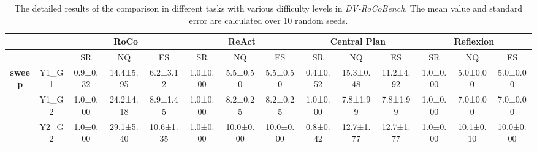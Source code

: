 \documentclass[11pt]{article}
\theoremstyle{plain}
\theoremstyle{remark}
\begin{document}
\begin{table}[t]
\vspace{-2em}
\caption{The detailed results of the comparison in different tasks with various difficulty levels in \emph{DV-RoCoBench}. The mean value and standard error are calculated over 10 random seeds.}
\vspace{-1em}
\begin{center}
\begin{small}
\begin{sc}
\scriptsize

\begin{adjustbox}{width=1\textwidth}
\begin{tabular}{ccccccccccclll}
\hline
\multicolumn{2}{c}{}                                     & \multicolumn{3}{c}{\textbf{RoCo}}                                & \multicolumn{3}{c}{\textbf{ReAct}}                               & \multicolumn{3}{c}{\textbf{Central Plan}}                          & \multicolumn{3}{c}{\textbf{Reflexion}}                                                                  \\ \hline
                          & \multicolumn{1}{c|}{}        & SR        & NQ         & \multicolumn{1}{c|}{ES}        & SR        & NQ         & \multicolumn{1}{c|}{ES}        & SR        & NQ           & \multicolumn{1}{c|}{ES}        & \multicolumn{1}{c}{SR}        & \multicolumn{1}{c}{NQ}         & \multicolumn{1}{c}{ES}        \\ \hline
\multirow{5}{*}{\textbf{sweep}}    & \multicolumn{1}{c|}{Y1\_G1}  & 0.9±0.32  & 14.4±5.95  & \multicolumn{1}{c|}{6.2±3.12}  & 1.0±0.00  & 5.5±0.50   & \multicolumn{1}{c|}{5.5±0.50}  & 0.4±0.52  & 15.3±0.48    & \multicolumn{1}{c|}{11.2±4.92} & \multicolumn{1}{c}{1.0±0.00}  & \multicolumn{1}{c}{5.0±0.00}   & \multicolumn{1}{c}{5.0±0.00}  \\
                          & \multicolumn{1}{c|}{Y1\_G2}  & 1.0±0.00  & 24.2±4.18  & \multicolumn{1}{c|}{8.9±1.45}  & 1.0±0.00  & 8.2±0.25   & \multicolumn{1}{c|}{8.2±0.25}  & 1.0±0.00  & 7.8±1.99     & \multicolumn{1}{c|}{7.8±1.99}  & \multicolumn{1}{c}{1.0±0.00}  & \multicolumn{1}{c}{7.0±0.00}   & \multicolumn{1}{c}{7.0±0.00}  \\
                          & \multicolumn{1}{c|}{Y2\_G2}  & 1.0±0.00  & 29.1±5.40  & \multicolumn{1}{c|}{10.6±1.35} & 1.0±0.00  & 10.0±0.00  & \multicolumn{1}{c|}{10.0±0.00} & 0.8±0.42  & 12.7±1.77    & \multicolumn{1}{c|}{12.7±1.77} & \multicolumn{1}{c}{1.0±0.00}  & \multicolumn{1}{c}{10.1±0.10}  & \multicolumn{1}{c}{10.0±0.00} \\

\end{tabular}
\end{adjustbox}
\end{sc}
\end{small}
\end{center}
\end{table}
\end{document}
